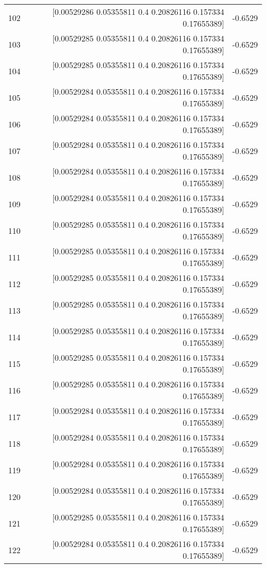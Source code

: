 \begin{longtable}{lrr}
102 & [0.00529286 0.05355811 0.4        0.20826116 0.157334   0.17655389] & -0.6529 \\
103 & [0.00529285 0.05355811 0.4        0.20826116 0.157334   0.17655389] & -0.6529 \\
104 & [0.00529285 0.05355811 0.4        0.20826116 0.157334   0.17655389] & -0.6529 \\
105 & [0.00529284 0.05355811 0.4        0.20826116 0.157334   0.17655389] & -0.6529 \\
106 & [0.00529284 0.05355811 0.4        0.20826116 0.157334   0.17655389] & -0.6529 \\
107 & [0.00529284 0.05355811 0.4        0.20826116 0.157334   0.17655389] & -0.6529 \\
108 & [0.00529284 0.05355811 0.4        0.20826116 0.157334   0.17655389] & -0.6529 \\
109 & [0.00529284 0.05355811 0.4        0.20826116 0.157334   0.17655389] & -0.6529 \\
110 & [0.00529285 0.05355811 0.4        0.20826116 0.157334   0.17655389] & -0.6529 \\
111 & [0.00529285 0.05355811 0.4        0.20826116 0.157334   0.17655389] & -0.6529 \\
112 & [0.00529285 0.05355811 0.4        0.20826116 0.157334   0.17655389] & -0.6529 \\
113 & [0.00529285 0.05355811 0.4        0.20826116 0.157334   0.17655389] & -0.6529 \\
114 & [0.00529285 0.05355811 0.4        0.20826116 0.157334   0.17655389] & -0.6529 \\
115 & [0.00529285 0.05355811 0.4        0.20826116 0.157334   0.17655389] & -0.6529 \\
116 & [0.00529285 0.05355811 0.4        0.20826116 0.157334   0.17655389] & -0.6529 \\
117 & [0.00529284 0.05355811 0.4        0.20826116 0.157334   0.17655389] & -0.6529 \\
118 & [0.00529284 0.05355811 0.4        0.20826116 0.157334   0.17655389] & -0.6529 \\
119 & [0.00529284 0.05355811 0.4        0.20826116 0.157334   0.17655389] & -0.6529 \\
120 & [0.00529284 0.05355811 0.4        0.20826116 0.157334   0.17655389] & -0.6529 \\
121 & [0.00529285 0.05355811 0.4        0.20826116 0.157334   0.17655389] & -0.6529 \\
122 & [0.00529284 0.05355811 0.4        0.20826116 0.157334   0.17655389] & -0.6529 \\

\end{longtable}

